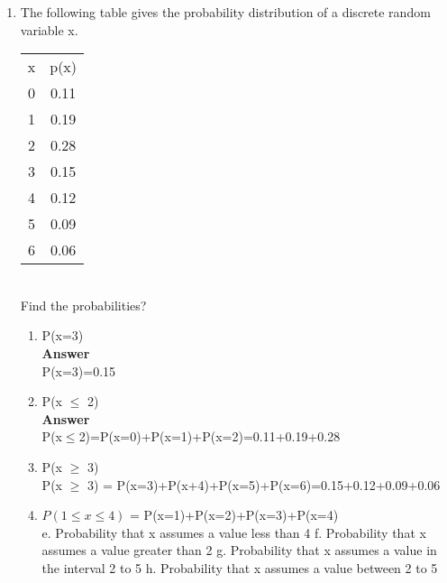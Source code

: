 \documentclass{article}\usepackage[]{graphicx}\usepackage[]{xcolor}
\begin{document}
\begin{enumerate}
\item The following table gives the probability distribution of a discrete random variable x.

\begin{tabular}{cc}
x & p(x)\\
0 & 0.11\\
1 & 0.19\\
2 & 0.28\\
3 & 0.15\\
4 & 0.12\\
5 & 0.09\\
6 & 0.06\\
\end{tabular}
\\
Find the probabilities?\\
\begin{enumerate}
\item P(x=3)	\\
\textbf{Answer}\\
P(x=3)=0.15
\item P(x $\leq$ 2) \\
\textbf{Answer}\\
P(x$\leq$2)=P(x=0)+P(x=1)+P(x=2)=0.11+0.19+0.28\\
\item P(x $\geq$ 3)\\
P(x $\geq$ 3) = P(x=3)+P(x+4)+P(x=5)+P(x=6)=0.15+0.12+0.09+0.06\
\item $P(1 \leq x \leq 4)$ = P(x=1)+P(x=2)+P(x=3)+P(x=4)\\
e.	Probability that x assumes a value less than 4
f.	Probability that x assumes a value greater than 2
g.	Probability that x assumes  a value in the interval 2 to 5
h.	Probability that x assumes  a value between 2 to 5


\end{enumerate}

\end{enumerate}
\end{document}
